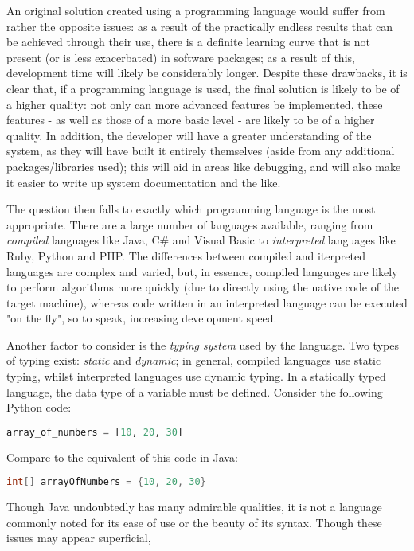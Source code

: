 \documentclass{article}[12pt,a4paper]
\begin{document}
An original solution created using a programming language would suffer from rather the opposite issues: as a result of the practically endless results that can be achieved through their use, there is a definite learning curve that is not present (or is less exacerbated) in software packages; as a result of this, development time will likely be considerably longer. Despite these drawbacks, it is clear that, if a programming language is used, the final solution is likely to be of a higher quality: not only can more advanced features be implemented, these features - as well as those of a more basic level - are likely to be of a higher quality.  In addition, the developer will have a greater understanding of the system, as they will have built it entirely themselves (aside from any additional packages/libraries used); this will aid in areas like debugging, and will also make it easier to write up system documentation and the like.

The question then falls to exactly which programming language is the most appropriate. There are a large number of languages available, ranging from \textit{compiled} languages like Java, C\# and Visual Basic to \textit{interpreted} languages like Ruby, Python and PHP. The differences between compiled and iterpreted languages are complex and varied, but, in essence, compiled languages are likely to perform algorithms more quickly (due to directly using the native code of the target machine), whereas code written in an interpreted language can be executed "on the fly", so to speak, increasing development speed. 

Another factor to consider is the \textit{typing system} used by the language. Two types of typing exist: \textit{static} and \textit{dynamic}; in general, compiled languages use static typing, whilst interpreted languages use dynamic typing. In a statically typed language, the data type of a variable must be defined. Consider the following Python code:

\begin{lstlisting}[language=Python]
array_of_numbers = [10, 20, 30]
\end{lstlisting}
Compare to the equivalent of this code in Java:

\begin{lstlisting}[language=Java]
int[] arrayOfNumbers = {10, 20, 30}
\end{lstlisting}

Though Java undoubtedly has many admirable qualities, it is not a language commonly noted for its ease of use or the beauty of its syntax. Though these issues may appear superficial,
\end{document}
